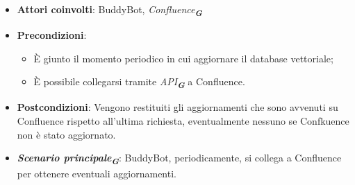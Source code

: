 
\begin{itemize}
    \item \textbf{Attori coinvolti}: BuddyBot, \emph{Confluence}\textsubscript{\textbf{\textit{G}}}
    \item \textbf{Precondizioni}: 
    \begin{itemize}
        \item È giunto il momento periodico in cui aggiornare il database vettoriale;
        \item È possibile collegarsi tramite \emph{API}\textsubscript{\textbf{\textit{G}}} a Confluence.
    \end{itemize}
    \item \textbf{Postcondizioni}: Vengono restituiti gli aggiornamenti che sono avvenuti su Confluence rispetto all'ultima richiesta, eventualmente nessuno 
    se Confkuence non è stato aggiornato.
    \item \textbf{\emph{Scenario principale}\textsubscript{\textbf{\textit{G}}}}: BuddyBot, periodicamente, si collega a Confluence per ottenere eventuali aggiornamenti.
\end{itemize}




